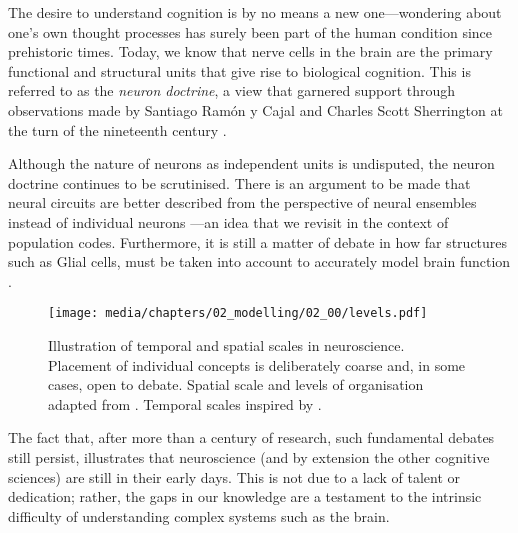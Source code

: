 
The desire to understand cognition is by no means a new one---wondering about one's own thought processes has surely been part of the human condition since prehistoric times.
Today, we know that nerve cells in the brain are the primary functional and structural units that give rise to biological cognition.
This is referred to as the \emph{neuron doctrine}, a view that garnered support through observations made by Santiago Ramón y Cajal and Charles Scott Sherrington at the turn of the nineteenth century \citep[Chapter~2]{yuste2015neuron,bear2016neuroscience}.

Although the nature of neurons as independent units is undisputed, the neuron doctrine continues to be scrutinised.
There is an argument to be made that neural circuits are better described from the perspective of neural ensembles instead of individual neurons \citep{yuste2015neuron,churchland1992computational}---an idea that we revisit in the context of population codes.
Furthermore, it is still a matter of debate in how far structures such as Glial cells, must be taken into account to accurately model brain function \citep[e.g.,][]{verkhratsky2000ion}.


\begin{figure}
	\centering
	\texttt{[image: media/chapters/02\_modelling/02\_00/levels.pdf]}
	\caption[Illustration of temporal and spatial scales in neuroscience]{Illustration of temporal and spatial scales in neuroscience. Placement of individual concepts is deliberately coarse and, in some cases, open to debate. Spatial scale and levels of organisation adapted from \citet[Figure~1.4, p.~11]{churchland1992computational}.
	Temporal scales inspired by \citet[Figure~1]{sejnowski2014putting}.
	}
	\label{fig:spatial_and_temporal_scales}
	\vspace*{-0.5em}
\end{figure}

The fact that,  after more than a century of research, such fundamental debates still persist, illustrates that neuroscience (and by extension the other cognitive sciences) are still in their early days.
This is not due to a lack of talent or dedication;
rather, the gaps in our knowledge are a testament to the intrinsic difficulty of understanding complex systems such as the brain.

